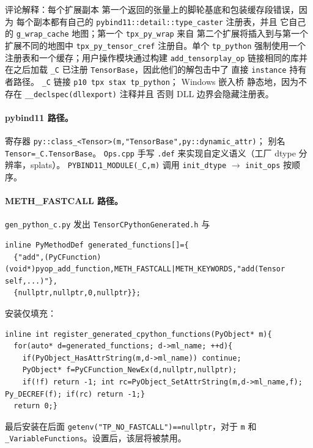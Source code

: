 评论解释：每个扩展副本
第一个返回的张量上的脚轮基底和包装缓存段错误，因为
每个副本都有自己的 \texttt{pybind11::detail::type\_caster} 注册表，并且
它自己的 \texttt{g\_wrap\_cache} 地图；第一个 \texttt{tpx\_py\_wrap} 来自
第二个扩展将插入到与第一个扩展不同的地图中
\texttt{tpx\_py\_tensor\_cref} 注册自。单个 \texttt{tp\_python}
强制使用一个注册表和一个缓存；用户操作模块通过构建
\texttt{add\_tensorplay\_op} 链接相同的库并在之后加载
\texttt{\_C} 已注册 \texttt{TensorBase}，因此他们的解包击中了
直接 \texttt{instance} 持有者路径。 \texttt{\_C} 链接 \texttt{p10 tpx stax
tp\_python}； Windows 嵌入桥
静态地，因为不存在 \texttt{\_\_declspec(dllexport)} 注释并且
否则 DLL 边界会隐藏注册表。

\paragraph{pybind11 路径。}
寄存器 \texttt{py::class\_<Tensor>(m,"TensorBase",py::dynamic\_attr)}；
 别名 \texttt{Tensor=\_C.TensorBase}。
\texttt{Ops.cpp} 手写 \texttt{.def} 来实现自定义语义（工厂 dtype
分辨率，splats）。 \texttt{PYBIND11\_MODULE(\_C,m)}
 调用 \texttt{init\_dtype} $\rightarrow$ \texttt{init\_ops}
按顺序。

\paragraph{METH\_FASTCALL 路径。} \texttt{gen\_python\_c.py}
发出 \texttt{TensorCPythonGenerated.h} 与

\begin{lstlisting}[caption={generated tables.}, label=lst:gentables]
inline PyMethodDef generated_functions[]={
  {"add",(PyCFunction)(void*)pyop_add_function,METH_FASTCALL|METH_KEYWORDS,"add(Tensor self,...)"},
  {nullptr,nullptr,0,nullptr}};
\end{lstlisting}

安装仅填充：

\begin{lstlisting}[caption={never shadows hand-written.}, label=lst:fillonly]
inline int register_generated_cpython_functions(PyObject* m){
  for(auto* d=generated_functions; d->ml_name; ++d){
    if(PyObject_HasAttrString(m,d->ml_name)) continue;
    PyObject* f=PyCFunction_NewEx(d,nullptr,nullptr);
    if(!f) return -1; int rc=PyObject_SetAttrString(m,d->ml_name,f); Py_DECREF(f); if(rc) return -1;}
  return 0;}
\end{lstlisting}

最后安装在后面
\texttt{getenv("TP\_NO\_FASTCALL")==nullptr}，对于 \texttt{m} 和
\texttt{\_VariableFunctions}。设置后，该层将被禁用。

